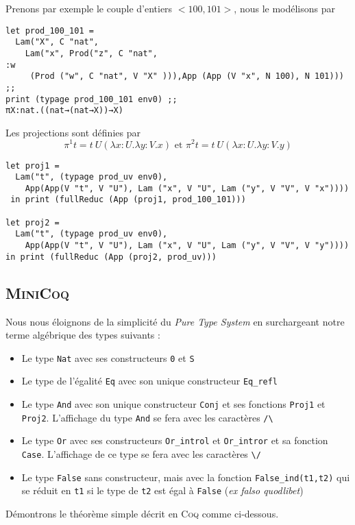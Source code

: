 Prenons par exemple le couple d'entiers $<100, 101>$, nous le modélisons par 
\begin{Verbatim}
let prod_100_101 = 
  Lam("X", C "nat", 
    Lam("x", Prod("z", C "nat", 
:w
     (Prod ("w", C "nat", V "X" ))),App (App (V "x", N 100), N 101))) ;;
print (typage prod_100_101 env0) ;;
πX:nat.((nat→(nat→X))→X)  
\end{Verbatim}

Les projections sont définies par 
$$\pi^1 t = t\ U (\lambda x:U.\lambda y:V. x) \text{  et  } \pi^2 t = t\ U (\lambda x:U.\lambda y:V. y)$$
\begin{Verbatim}
let proj1 = 
  Lam("t", (typage prod_uv env0), 
    App(App(V "t", V "U"), Lam ("x", V "U", Lam ("y", V "V", V "x"))))
 in print (fullReduc (App (proj1, prod_100_101)))

let proj2 = 
  Lam("t", (typage prod_uv env0),
    App(App(V "t", V "U"), Lam ("x", V "U", Lam ("y", V "V", V "y"))))
in print (fullReduc (App (proj2, prod_uv)))
\end{Verbatim}

\subsection{\textsc{MiniCoq}}
Nous  nous éloignons de la simplicité du \textit{Pure Type System} en surchargeant notre
 terme algébrique des types suivants :
\begin{itemize}
  \item Le type \verb+Nat+ avec ses constructeurs \verb+0+ et \verb+S+
  \item Le type de l'égalité \verb+Eq+ avec son unique constructeur \verb+Eq_refl+
  \item Le type \verb+And+ avec son unique constructeur \verb+Conj+ et ses fonctions
  \verb+Proj1+ et \verb+Proj2+. L'affichage du type \verb+And+ se fera avec les caractères \verb+/\+
  \item Le type \verb+Or+ avec ses constructeurs \verb+Or_introl+ et \verb+Or_intror+ et sa fonction \verb+Case+.
  L'affichage de ce type se fera avec les caractères \verb+\/+
  \item Le type \verb+False+ sans constructeur, mais avec la fonction \verb+False_ind(t1,t2)+ qui se
  réduit en \verb+t1+ si le type de \verb+t2+ est égal à \verb+False+  (\textit{ex falso quodlibet})
\end{itemize}

\vspace{0.2cm}
Démontrons le théorème simple décrit en \textsc{Coq} comme ci-dessous.


